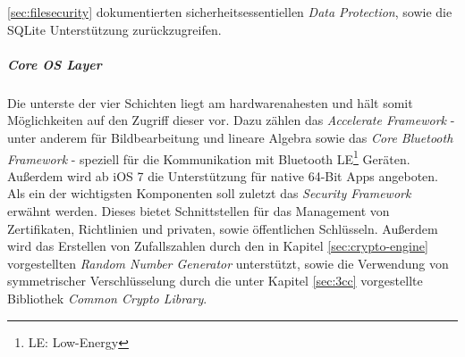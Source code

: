 				\ref{sec:filesecurity} dokumentierten sicherheitsessentiellen \textsl{Data
				Protection}, sowie die SQLite Unterstützung zurückzugreifen.
			\subparagraph{Core OS Layer}
				Die unterste der vier Schichten liegt am hardwarenahesten und hält somit
				Möglichkeiten auf den Zugriff dieser vor. Dazu zählen das \textsl{Accelerate
				Framework} - unter anderem für Bildbearbeitung und lineare Algebra sowie das
				\textsl{Core Bluetooth Framework} - speziell für die Kommunikation mit
				Bluetooth LE\footnote{LE: Low-Energy} Geräten. Außerdem wird ab iOS 7
				die Unterstützung für native 64-Bit Apps angeboten. Als ein der wichtigsten
				Komponenten soll zuletzt das \textsl{Security Framework} erwähnt werden.
				Dieses bietet Schnittstellen für das Management von Zertifikaten, Richtlinien
				und privaten, sowie öffentlichen Schlüsseln. Außerdem wird das Erstellen von
				Zufallszahlen durch den in Kapitel \ref{sec:crypto-engine}
				vorgestellten \textsl{Random Number Generator} unterstützt, sowie die
				Verwendung von symmetrischer Verschlüsselung durch die unter Kapitel
				\ref{sec:3cc} vorgestellte Bibliothek \textsl{Common Crypto Library}.
